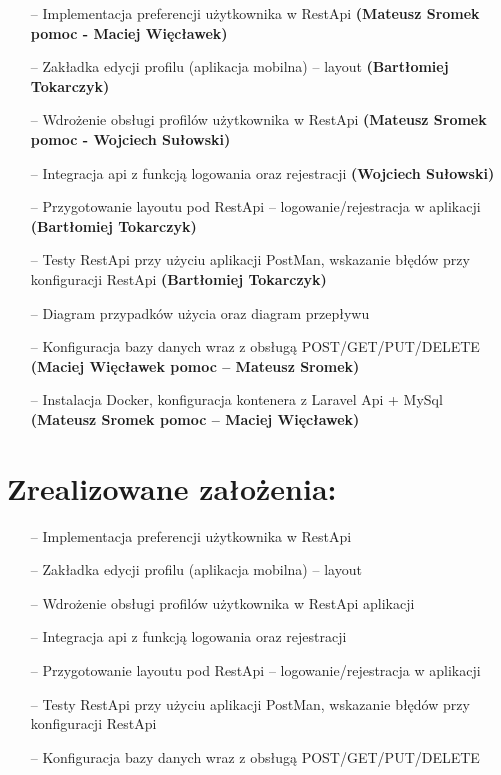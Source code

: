 \documentclass[12pt,a4paper]{article}
\begin{document}
\begin{itemize}
    \item [--] Implementacja preferencji użytkownika w RestApi \textbf{(Mateusz Sromek pomoc - Maciej Więcławek)}

    \item [--] Zakładka edycji profilu (aplikacja mobilna) – layout \textbf{(Bartłomiej Tokarczyk)}

    \item [--] Wdrożenie obsługi profilów użytkownika w RestApi \textbf{(Mateusz Sromek pomoc - Wojciech Sułowski)}

    \item [--] Integracja api z funkcją logowania oraz rejestracji \textbf{(Wojciech Sułowski)}
    \item [--] Przygotowanie layoutu pod RestApi – logowanie/rejestracja w aplikacji \textbf{(Bartłomiej Tokarczyk)}
    \item [--] Testy RestApi przy użyciu aplikacji PostMan, wskazanie błędów przy konfiguracji RestApi \textbf{(Bartłomiej Tokarczyk)}
    \item [--] Diagram przypadków użycia oraz diagram przepływu
    \item [--] Konfiguracja bazy danych wraz z obsługą POST/GET/PUT/DELETE \textbf{(Maciej Więcławek pomoc – Mateusz Sromek)}
    \item [--] Instalacja Docker, konfiguracja kontenera z Laravel Api + MySql \textbf{(Mateusz Sromek pomoc – Maciej Więcławek)}

\end{itemize}

\section{Zrealizowane założenia:}
\begin{itemize}
    \item [--] Implementacja preferencji użytkownika w RestApi 
    \item [--] Zakładka edycji profilu (aplikacja mobilna) – layout    
    \item [--] Wdrożenie obsługi profilów użytkownika w RestApi aplikacji
    \item [--] Integracja api z funkcją logowania oraz rejestracji
    \item [--] Przygotowanie layoutu pod RestApi – logowanie/rejestracja w aplikacji
    \item [--] Testy RestApi przy użyciu aplikacji PostMan, wskazanie błędów przy konfiguracji RestApi
    \item [--]Konfiguracja bazy danych wraz z obsługą POST/GET/PUT/DELETE
 
\end{itemize}
\end{document}
